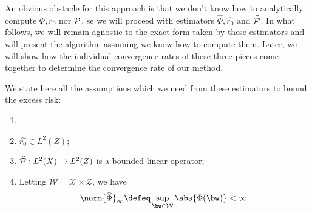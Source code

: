 An obvious obstacle for this approach is that we don't know how to analytically compute $ \Phi, r_{ 0 } $ nor $ \mathcal{P} $, se we will proceed with estimators $ \hat{ \Phi }, \hat{ r_{ 0 } } $ and $ \widehat{ \mathcal{P} } $.
In what follows, we will remain agnostic to the exact form taken by these estimators and will present the algorithm assuming we know how to compute them.
Later, we will show how the individual convergence rates of these three pieces come together to determine the convergence rate of our method.

We state here all the assumptions which we need from these estimators to bound the excess risk:
\begin{assumption}
    \label{estimator assumptions}
    \begin{enumerate}
        \item[] 
        \item $ \hat{ r_{ 0 } } \in L^{ 2 } ( Z ) $;
        \item $ \widehat{ \mathcal{P} } : L^{ 2 } ( X ) \to L^{ 2 } ( Z ) $ is a bounded linear operator;
        \item Letting $ \mathcal{W} = \mathcal{X} \times \mathcal{Z} $, we have
            \begin{equation*}
                \norm{ \hat{ \Phi } }_{ \infty } \defeq \sup_{ \bw \in \mathcal{W} } \abs{ \Phi ( \bw ) } < \infty
            .\end{equation*}
    \end{enumerate}
\end{assumption}
